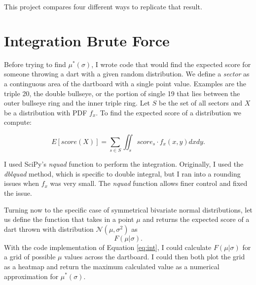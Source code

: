 \documentclass[]{article}
\begin{document}
This project compares four different ways to replicate that result.


\section{Integration Brute Force}
Before trying to find $\mu^*(\sigma)$, I wrote code that would find the expected score for someone throwing a dart with a given random distribution. We define a \textit{sector} as a continguous area of the dartboard with a single point value. Examples are the triple 20, the double bullseye, or the portion of single 19 that lies between the outer bullseye ring and the inner triple ring. Let $S$ be the set of all sectors and $X$ be a distribution with PDF $f_x$. To find the expected score of a distribution we compute:



\begin{equation}
	E[score(X)] = \sum_{s \in S} \iint_{s} score_s \cdot  f_x(x, y)  dxdy.
	\label{eq:int}
\end{equation}

I used SciPy's \textit{nquad} function to perform the integration. Originally, I used the \textit{dblquad} method, which is specific to double integral, but I ran into a rounding issues when $f_x$ was very small. The \textit{nquad} function allows finer control and fixed the issue. 

Turning now to the specific case of symmetrical bivariate normal distributions,  let us define the function that takes in a point $\mu$ and returns the expected score of a dart thrown with distribution $\mathcal{N}(\mu, \sigma^2)$ as
\begin{equation}
	F(\mu \vert \sigma).
	\label{eq:fmusig}
\end{equation}
With the code implementation of Equation \ref{eq:int}, I could calculate $F(\mu \vert \sigma)$ for a grid of possible $\mu$ values across the dartboard. I could then both plot the grid as a heatmap and return the maximum calculated value as a numerical approximation for $\mu^*(\sigma)$.
\end{document}
